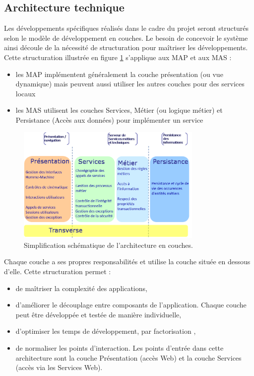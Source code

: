 \documentclass[12pt,a4paper]{article}
\begin{document}
\subsection{Architecture technique}
Les développements spécifiques réalisés dans le cadre du projet seront structurés selon le modèle de développement en couches. Le besoin de concevoir le système ainsi découle de la nécessité de structuration pour maîtriser les développements. Cette structuration illustrée en figure \ref{couches} s’applique aux \gls{MAP} et aux \gls{MAS} :
\smallbreak
\begin{itemize}
\item	les \gls{MAP} implémentent généralement la couche présentation (ou vue dynamique) mais peuvent aussi utiliser les autres couches pour des services locaux
\item	les \gls{MAS} utilisent les couches Services, Métier (ou logique métier) et Persistance (Accès aux données) pour implémenter un service
\end{itemize}
\bigbreak
\begin{figure}[H]
	\begin{center}
		\includegraphics[width=0.8\textwidth,keepaspectratio]{couchesModules.png}
		\caption{Simplification schématique de l'architecture en couches.}
		\label{couches}
	\end{center}
\end{figure}
Chaque couche a ses propres responsabilités et utilise la couche située en dessous d’elle. Cette structuration permet :
\smallbreak
\begin{itemize}
\item	de maîtriser la complexité des applications,
\item	d’améliorer le découplage entre composants de l’application. Chaque couche peut être développée et testée de manière individuelle,
\item	d’optimiser les temps de développement, par factorisation ,
\item	de normaliser les points d’interaction. Les points d’entrée dans cette architecture sont la couche Présentation (accès Web) et la couche Services (accès via les Services Web).
\end{itemize}
\end{document}

